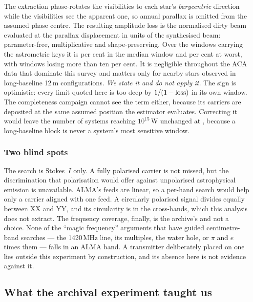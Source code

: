 The extraction phase-rotates the visibilities to each star's
\emph{barycentric} direction while the visibilities see the apparent one, so
annual parallax is omitted from the assumed phase centre. The resulting
amplitude loss is the normalised dirty beam evaluated at the parallax
displacement in units of the synthesised beam: parameter-free,
multiplicative and shape-preserving. Over the \PxNWin{} windows carrying the
astrometric keys it is \PxLossMedPct{} per cent in the median window and
\PxLossMaxPct{} per cent at worst, with \PxNGtTen{} windows losing more than
ten per cent. It is negligible throughout the ACA data that dominate this
survey and matters only for nearby stars observed in long-baseline 12\,m
configurations. \emph{We state it and do not apply it.} The sign is optimistic: every
limit quoted here is too deep by $1/(1-{\rm loss})$ in its own window. The
completeness campaign cannot see the term either, because its carriers are
deposited at the same assumed position the estimator evaluates. Correcting
it would leave the number of systems
reaching $10^{15}$\,W unchanged at \PxNSysCorr, because a long-baseline
block is never a system's most sensitive window.

\subsubsection{Two blind spots}

The search is Stokes~$I$ only. A fully polarised carrier is not missed, but
the discrimination that polarisation would offer against unpolarised
astrophysical emission is unavailable. ALMA's feeds are linear, so a per-hand search would help only a carrier
aligned with one feed. A circularly polarised signal divides equally between
XX and YY, and its circularity is in the cross-hands, which this analysis
does not extract. The frequency coverage, finally, is the archive's and not
a choice. None of the ``magic frequency'' arguments that have guided
centimetre-band searches --- the 1420\,MHz line, its multiples, the water
hole, or $\pi$ and $e$ times them --- falls in an ALMA band. A transmitter
deliberately placed on one lies outside this experiment by construction, and
its absence here is not evidence against it.

\subsection{What the archival experiment taught us}
\label{sec:lessons}

